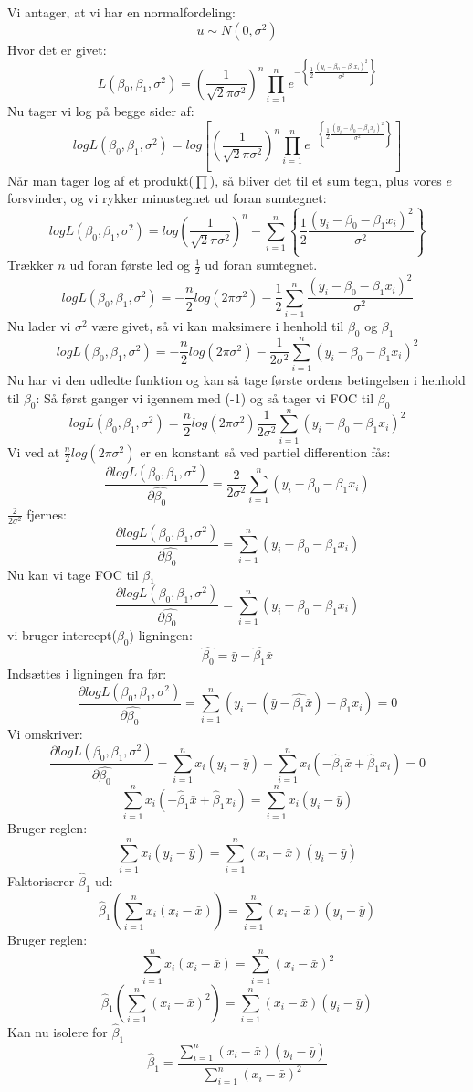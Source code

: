 \documentclass[
  10pt,
]{article}
\begin{document}
Vi antager, at vi har en normalfordeling: \[ u\sim N(0,\sigma^2) \] Hvor
det er givet:
\[ L(\beta_0, \beta_1,\sigma^2)=\left(\frac{1}{\sqrt2\pi\sigma^2}\right)^n\prod\limits_{i=1}^n e^{-\left\{\frac{1}{2}\frac{(y_i-\beta_0-\beta_1x_i)^2}{\sigma^2}  \right\}} \]
Nu tager vi log på begge sider af:
\[ logL(\beta_0, \beta_1,\sigma^2)=log\left[\left(\frac{1}{\sqrt2\pi\sigma^2}\right)^n\prod\limits_{i=1}^n e^{-\left\{\frac{1}{2}\frac{(y_i-\beta_0-\beta_1x_i)^2}{\sigma^2}  \right\}}\right] \]
Når man tager log af et produkt(\(\prod\)), så bliver det til et sum
tegn, plus vores \(e\) forsvinder, og vi rykker minustegnet ud foran
sumtegnet:
\[logL(\beta_0, \beta_1,\sigma^2)=log\left(\frac{1}{\sqrt2\pi\sigma^2}\right)^n-\sum\limits_{i=1}^n {\left\{\frac{1}{2}\frac{(y_i-\beta_0-\beta_1x_i)^2}{\sigma^2}  \right\}} \]
Trækker \(n\) ud foran første led og \(\frac{1}{2}\) ud foran sumtegnet.
\[logL(\beta_0, \beta_1,\sigma^2)= -\frac{n}{2}log(2\pi\sigma^2)-\frac{1}{2}\sum\limits_{i=1}^n\frac{(y_i-\beta_0-\beta_1x_i)^2}{\sigma^2} \]
Nu lader vi \(\sigma^2\) være givet, så vi kan maksimere i henhold til
\(\beta_0\) og \(\beta_1\)
\[logL(\beta_0, \beta_1,\sigma^2)= -\frac{n}{2}log(2\pi\sigma^2)-\frac{1}{2\sigma^2}\sum\limits_{i=1}^n(y_i-\beta_0-\beta_1x_i)^2 \]
Nu har vi den udledte funktion og kan så tage første ordens betingelsen
i henhold til \(\beta_0\): Så først ganger vi igennem med (-1) og så
tager vi FOC til \(\beta_0\)
\[logL(\beta_0, \beta_1,\sigma^2)= \frac{n}{2}log(2\pi\sigma^2)\frac{1}{2\sigma^2}\sum\limits_{i=1}^n(y_i-\beta_0-\beta_1x_i)^2 \]
Vi ved at \(\frac{n}{2}log(2\pi\sigma^2)\) er en konstant så ved partiel
differention fås:
\[ \frac{\partial logL(\beta_0,\beta_1,\sigma^2)}{\partial\hat{\beta_0}}=\frac {2} {2\sigma^2}\sum\limits_{i=1}^n(y_i-\beta_0-\beta_1x_i)\]
\(\frac{2}{2\sigma^2}\) fjernes:
\[ \frac{\partial logL(\beta_0,\beta_1,\sigma^2)}{\partial\hat{\beta_0}}=\sum\limits_{i=1}^n(y_i-\beta_0-\beta_1x_i)\]
Nu kan vi tage FOC til \(\beta_1\)
\[ \frac{\partial logL(\beta_0,\beta_1,\sigma^2)}{\partial\hat{\beta_0}}=\sum\limits_{i=1}^n(y_i-\beta_0-\beta_1x_i)\]
vi bruger intercept(\(\beta_0\)) ligningen:
\[\hat{\beta_0}=\bar{y}-\hat{\beta_1}\bar{x} \] Indsættes i ligningen
fra før:
\[ \frac{\partial logL(\beta_0,\beta_1,\sigma^2)}{\partial\hat{\beta_0}}=\sum\limits_{i=1}^n(y_i-(\bar{y}-\hat{\beta_1}\bar{x})-\beta_1x_i)=0\]
Vi omskriver:
\[ \frac{\partial logL(\beta_0,\beta_1,\sigma^2)}{\partial\hat{\beta_0}} =\sum\limits_{i=1}^n x_i(y_i-\bar{y})-\sum\limits_{i=1}^n x_i(-\hat\beta_1\bar{x}+\hat\beta_1x_i)=0\]
\[\sum\limits_{i=1}^n x_i(-\hat\beta_1\bar{x}+\hat\beta_1x_i) =\sum\limits_{i=1}^n x_i(y_i-\bar{y})\]
Bruger reglen:
\[ \sum\limits_{i=1}^n x_i(y_i-\bar{y}) =\sum\limits_{i=1}^n(x_i-\bar{x})(y_i-\bar{y})\]
Faktoriserer \(\hat\beta_1\) ud:
\[\hat\beta_1\left(\sum\limits_{i=1}^nx_i(x_i-\bar{x})\right) =\sum\limits_{i=1}^n(x_i-\bar{x})(y_i-\bar{y})\]
Bruger reglen:
\[\sum\limits_{i=1}^nx_i(x_i-\bar{x})=\sum\limits_{i=1}^n(x_i-\bar{x})^2 \]
\[ \hat\beta_1\left( \sum\limits_{i=1}^n(x_i-\bar{x})^2 \right) = \sum\limits_{i=1}^n(x_i-\bar{x})(y_i-\bar{y}) \]
Kan nu isolere for \(\hat\beta_1\)
\[\hat\beta_1 = \frac{\sum\limits_{i=1}^n(x_i-\bar{x})(y_i-\bar{y})} {\sum\limits_{i=1}^n(x_i-\bar{x})^2} \]
\end{document}
